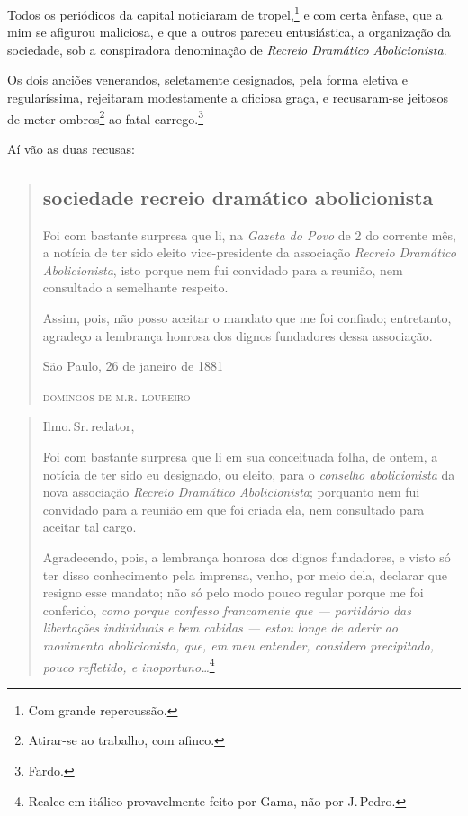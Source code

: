 {Todos os periódicos da capital noticiaram de tropel,\footnote{Com
  grande repercussão.} e com certa ênfase, que a mim se afigurou
maliciosa, e que a outros pareceu entusiástica, a organização da
sociedade, sob a conspiradora denominação de \emph{Recreio
Dramático Abolicionista}.

Os dois anciões venerandos, seletamente designados, pela forma eletiva e
regularíssima, rejeitaram modestamente a oficiosa graça, e recusaram-se
jeitosos de meter ombros\footnote{Atirar-se ao trabalho, com afinco.}
ao fatal carrego.\footnote{Fardo.}

Aí vão as duas recusas:

\begin{quote}
\subsection{sociedade recreio dramático abolicionista}

Foi com bastante surpresa que li, na \emph{Gazeta do Povo} de 2 do
corrente mês, a notícia de ter sido eleito vice-presidente da associação
\emph{Recreio Dramático Abolicionista}, isto porque nem fui convidado
para a reunião, nem consultado a semelhante respeito.

Assim, pois, não posso aceitar o mandato que me foi confiado;
entretanto, agradeço a lembrança honrosa dos dignos fundadores dessa
associação.\medskip

\hfill{}São Paulo, 26 de janeiro de 1881

\hfill\textsc{domingos de m.r. loureiro}
\end{quote}

\asterisc

\begin{quote}
Ilmo.\,Sr.\,redator,

Foi com bastante surpresa que li em sua conceituada folha, de ontem, a
notícia de ter sido eu designado, ou eleito, para o \emph{conselho
abolicionista} da nova associação \emph{Recreio Dramático
Abolicionista}; porquanto nem fui convidado para a reunião em que foi
criada ela, nem consultado para aceitar tal cargo.

Agradecendo, pois, a lembrança honrosa dos dignos fundadores, e visto só
ter disso conhecimento pela imprensa, venho, por meio dela, declarar que
resigno esse mandato; não só pelo modo pouco regular porque me foi
conferido, \emph{como porque confesso francamente que --- partidário
das libertações individuais e bem cabidas --- estou longe de aderir ao
movimento abolicionista, que, em meu entender, considero precipitado,
pouco refletido, e inoportuno\ldots{}}\footnote{Realce em itálico
  provavelmente feito por Gama, não por J.\,Pedro.}\medskip


\end{quote}}

